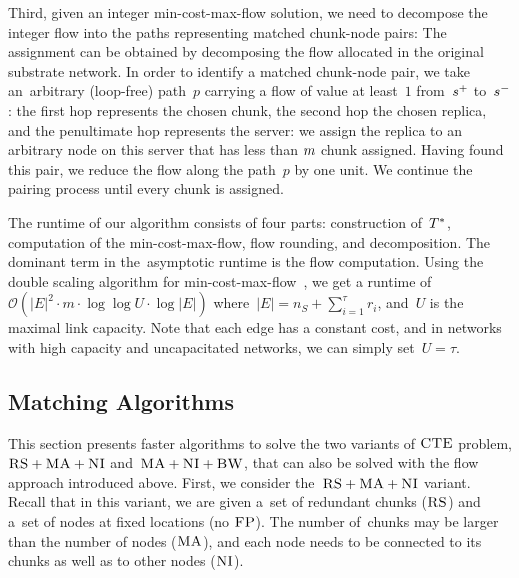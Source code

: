 Third, given an integer min-cost-max-flow solution, we need to decompose
the integer flow into the paths
representing matched chunk-node pairs:
The assignment can be obtained by decomposing the flow allocated in the
original substrate network. In order to identify a matched chunk-node pair,
we take an~arbitrary (loop-free) path~$p$ carrying a flow of value at least~$1$ from~$s^{+}$ to~$s^{-}$:
the first hop represents the chosen chunk, the second hop the chosen
replica, and the penultimate hop represents the server: we assign
the replica to an arbitrary node on this server that has less than $m$ chunk assigned.
Having found this pair, we reduce the flow
along the path~$p$ by one unit.
We continue the pairing process until every chunk is assigned.

The runtime of our algorithm consists of four parts: construction of~$T^*$,
computation of the min-cost-max-flow, flow rounding, and decomposition. The
dominant term in the~asymptotic runtime is the flow computation.
Using the double scaling algorithm for min-cost-max-flow~\cite{mincostmaxflow-state}, we get a runtime of~$\mathcal{O}(|E|^2\cdot m \cdot\log\log U \cdot \log |E|)$
where~$|E| = n_S+\sum_{i=1}^\tau r_i$, and~$U$ is the maximal link capacity. Note that each edge has a constant cost, and in networks with high capacity
and uncapacitated networks, we can simply set~$U=\tau$.


\subsection{Matching Algorithms}\label{ssec:match}


This section presents faster algorithms to solve 
the two variants of $\textsc{CTE}$ problem, $\textsc{RS}+\textsc{MA}+\textsc{NI}$ and~$\textsc{MA}+\textsc{NI}+\textsc{BW}$, that can also be solved with the flow approach
introduced above.
First, we consider the~$\textsc{RS}+\textsc{MA}+\textsc{NI}$ variant.
Recall that in this variant,
we are given a~set of redundant chunks ($\textsc{RS}$) and a~set of nodes
at fixed locations (no $\textsc{FP}$). The number of~chunks may be larger than the number
of nodes ($\textsc{MA}$), and each node needs to be connected
to its chunks as well as to other nodes ($\textsc{NI}$).

